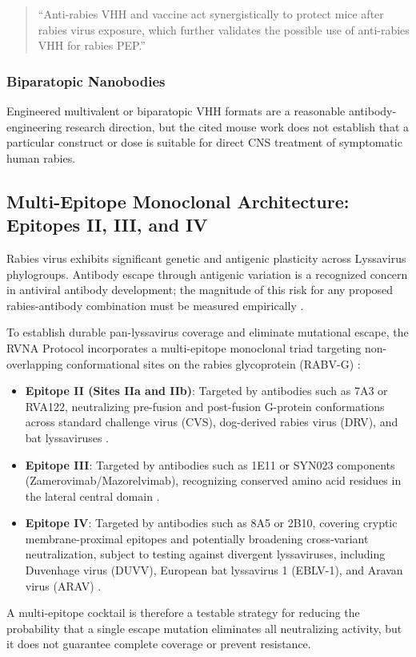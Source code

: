 \documentclass[12pt,a4paper]{article}
\begin{document}
\begin{quote}
``Anti-rabies VHH and vaccine act synergistically to protect mice after rabies virus exposure, which further validates the possible use of anti-rabies VHH for rabies PEP.'' \citep{terryn2016vhh}
\end{quote}

\subsubsection{Biparatopic Nanobodies}

Engineered multivalent or biparatopic VHH formats are a reasonable antibody-engineering research direction, but the cited mouse work does not establish that a particular construct or dose is suitable for direct CNS treatment of symptomatic human rabies.

\subsection{Multi-Epitope Monoclonal Architecture: Epitopes II, III, and IV}

Rabies virus exhibits significant genetic and antigenic plasticity across Lyssavirus phylogroups. Antibody escape through antigenic variation is a recognized concern in antiviral antibody development; the magnitude of this risk for any proposed rabies-antibody combination must be measured empirically \citep{sloan2007mab, ren2025synb1}. 

To establish durable pan-lyssavirus coverage and eliminate mutational escape, the RVNA Protocol incorporates a multi-epitope monoclonal triad targeting non-overlapping conformational sites on the rabies glycoprotein (RABV-G) \citep{ren2025synb1}:
\begin{itemize}
    \item \textbf{Epitope II (Sites IIa and IIb)}: Targeted by antibodies such as 7A3 or RVA122, neutralizing pre-fusion and post-fusion G-protein conformations across standard challenge virus (CVS), dog-derived rabies virus (DRV), and bat lyssaviruses \citep{callaway2022ravg, ren2025synb1}.
    \item \textbf{Epitope III}: Targeted by antibodies such as 1E11 or SYN023 components (Zamerovimab/Mazorelvimab), recognizing conserved amino acid residues in the lateral central domain \citep{liu2025syn023, ren2025synb1}.
    \item \textbf{Epitope IV}: Targeted by antibodies such as 8A5 or 2B10, covering cryptic membrane-proximal epitopes and potentially broadening cross-variant neutralization, subject to testing against divergent lyssaviruses, including Duvenhage virus (DUVV), European bat lyssavirus 1 (EBLV-1), and Aravan virus (ARAV) \citep{ren2025synb1}.
\end{itemize}
A multi-epitope cocktail is therefore a testable strategy for reducing the probability that a single escape mutation eliminates all neutralizing activity, but it does not guarantee complete coverage or prevent resistance.
\end{document}
